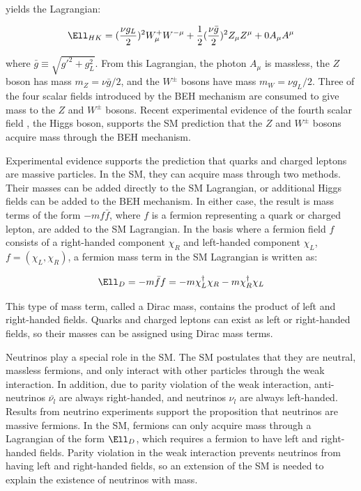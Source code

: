 yields the Lagrangian:

\begin{equation}
	\Ell_{HK} = (\frac{\nu g_{L}}{2})^{2}W^{+}_{\mu}W^{-\mu} + \frac{1}{2}(\frac{\nu \bar{g}}{2})^{2}Z_{\mu}Z^{\mu} + 0A_{\mu}A^{\mu}
\end{equation}

where $\bar{g} \equiv \sqrt{g'^{2} + g^{2}_{L}}$.  From this Lagrangian, the photon $A_{\mu}$ is massless, 
the $Z$ boson has mass $m_{Z} = \nu\bar{g}/2$, and the $W^{\pm}$ bosons have mass $m_{W} = \nu g_{L}/2$.  
Three of the four scalar fields introduced by the BEH mechanism are consumed to give mass to the $Z$ 
and $W^{\pm}$ bosons.  Recent experimental evidence of the fourth scalar field \cite{combinedHiggsResult}, the Higgs boson, 
supports the SM prediction that the $Z$ and $W^{\pm}$ bosons acquire mass through the BEH mechanism.

Experimental evidence supports the prediction that quarks and charged leptons are massive particles.  In the SM, they can acquire mass 
through two methods.  Their masses can be added directly to the SM Lagrangian, or additional Higgs fields 
can be added to the BEH mechanism.  In either case, the result is mass terms of the form $-mf\bar{f}$, where $f$ is a fermion 
representing a quark or charged lepton, are added to the SM Lagrangian.  In the basis where a 
fermion field $f$ consists of a right-handed component $\chi_{R}$ and left-handed 
component $\chi_{L}$, $f = (\chi_{L},\chi_{R})$, a fermion mass term in the SM Lagrangian is written as:

\begin{equation}
	\Ell_{D} = -m\bar{f}f = -m\chi^{\dagger}_{L}\chi_{R} - m\chi^{\dagger}_{R}\chi_{L}
\end{equation}

This type of mass term, called a Dirac mass, contains the product of left and right-handed fields.  Quarks 
and charged leptons can exist as left or right-handed fields, so their masses can be assigned using Dirac 
mass terms.

Neutrinos play a special role in the SM.  The SM postulates that they are neutral, massless fermions, and only interact 
with other particles through the weak interaction.  In addition, due to parity violation of the weak interaction, 
anti-neutrinos $\bar{\nu_{l}}$ are always right-handed, and neutrinos $\nu_{l}$ are always left-handed.  Results 
from neutrino experiments \cite{NOvAresults,mainzPhaseIIResults,t2kResults} support the proposition that neutrinos 
are massive fermions.  In the SM, fermions can only acquire mass through a Lagrangian of the form $\Ell_{D}$, 
which requires a fermion to have left and right-handed fields.  Parity violation in the weak interaction prevents 
neutrinos from having left and right-handed fields, so an extension of the SM is needed to explain the existence 
of neutrinos with mass.


